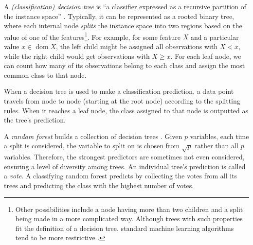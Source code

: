 \documentclass{l4proj}
\theoremstyle{definition}
\theoremstyle{remark}
\DeclareMathOperator{\dom}{dom}
\begin{document}
A \emph{(classification) decision tree} is ``a classifier expressed as a
recursive partition of the instance space'' \cite{DBLP:series/smpai/RokachM14}.
Typically, it can be represented as a rooted binary tree, where each internal
node \emph{splits} the instance space into two regions based on the value of one
of the features\footnote{Other possibilities include a node having more than two
  children and a split being made in a more complicated way. Although trees with
  such properties fit the definition of a decision tree, standard machine
  learning algorithms tend to be more restrictive \cite{James:2014:ISL:2517747,
    DBLP:series/smpai/RokachM14}.}. For example, for some feature $X$ and a
particular value $x \in \dom{X}$, the left child might be assigned all
observations with $X < x$, while the right child would get observations with $X
\ge x$. For each leaf node, we can count how many of its observations belong to
each class and assign the most common class to that node.

When a decision tree is used to make a classification prediction, a data point
travels from node to node (starting at the root node) according to the splitting
rules. When it reaches a leaf node, the class assigned to that node is outputted
as the tree's prediction.

A \emph{random forest} builds a collection of decision trees
\cite{James:2014:ISL:2517747}. Given $p$ variables, each time a split is
considered, the variable to split on is chosen from $\sqrt{p}$ rather than all
$p$ variables. Therefore, the strongest predictors are sometimes not even
considered, ensuring a level of diversity among trees. An individual tree's
prediction is called a \emph{vote}. A classifying random forest predicts by
collecting the votes from all its trees and predicting the class with the
highest number of votes.
\end{document}

